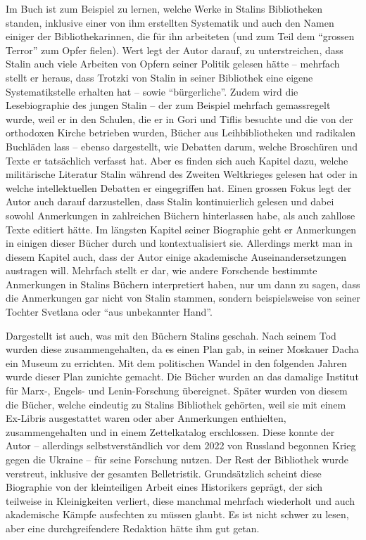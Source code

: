 \documentclass[a4paper,
fontsize=11pt,
oneside,
numbers=noperiodatend,
parskip=half-,
bibliography=totoc,
final
]{scrartcl}
\begin{document}
Im Buch ist zum Beispiel zu lernen, welche Werke in Stalins Bibliotheken
standen, inklusive einer von ihm erstellten Systematik und auch den
Namen einiger der Bibliothekarinnen, die für ihn arbeiteten (und zum
Teil dem \enquote{grossen Terror} zum Opfer fielen). Wert legt der Autor
darauf, zu unterstreichen, dass Stalin auch viele Arbeiten von Opfern
seiner Politik gelesen hätte -- mehrfach stellt er heraus, dass Trotzki
von Stalin in seiner Bibliothek eine eigene Systematikstelle erhalten
hat -- sowie \enquote{bürgerliche}. Zudem wird die Lesebiographie des
jungen Stalin -- der zum Beispiel mehrfach gemassregelt wurde, weil er
in den Schulen, die er in Gori und Tiflis besuchte und die von der
orthodoxen Kirche betrieben wurden, Bücher aus Leihbibliotheken und
radikalen Buchläden lass -- ebenso dargestellt, wie Debatten darum,
welche Broschüren und Texte er tatsächlich verfasst hat. Aber es finden
sich auch Kapitel dazu, welche militärische Literatur Stalin während des
Zweiten Weltkrieges gelesen hat oder in welche intellektuellen Debatten
er eingegriffen hat. Einen grossen Fokus legt der Autor auch darauf
darzustellen, dass Stalin kontinuierlich gelesen und dabei sowohl
Anmerkungen in zahlreichen Büchern hinterlassen habe, als auch zahllose
Texte editiert hätte. Im längsten Kapitel seiner Biographie geht er
Anmerkungen in einigen dieser Bücher durch und kontextualisiert sie.
Allerdings merkt man in diesem Kapitel auch, dass der Autor einige
akademische Auseinandersetzungen austragen will. Mehrfach stellt er dar,
wie andere Forschende bestimmte Anmerkungen in Stalins Büchern
interpretiert haben, nur um dann zu sagen, dass die Anmerkungen gar
nicht von Stalin stammen, sondern beispielsweise von seiner Tochter
Svetlana oder \enquote{aus unbekannter Hand}.

Dargestellt ist auch, was mit den Büchern Stalins geschah. Nach seinem
Tod wurden diese zusammengehalten, da es einen Plan gab, in seiner
Moskauer Dacha ein Museum zu errichten. Mit dem politischen Wandel in
den folgenden Jahren wurde dieser Plan zunichte gemacht. Die Bücher
wurden an das damalige Institut für Marx-, Engels- und Lenin-Forschung
übereignet. Später wurden von diesem die Bücher, welche eindeutig zu
Stalins Bibliothek gehörten, weil sie mit einem Ex-Libris ausgestattet
waren oder aber Anmerkungen enthielten, zusammengehalten und in einem
Zettelkatalog erschlossen. Diese konnte der Autor -- allerdings
selbstverständlich vor dem 2022 von Russland begonnen Krieg gegen die
Ukraine -- für seine Forschung nutzen. Der Rest der Bibliothek wurde
verstreut, inklusive der gesamten Belletristik. Grundsätzlich scheint
diese Biographie von der kleinteiligen Arbeit eines Historikers geprägt,
der sich teilweise in Kleinigkeiten verliert, diese manchmal mehrfach
wiederholt und auch akademische Kämpfe ausfechten zu müssen glaubt. Es
ist nicht schwer zu lesen, aber eine durchgreifendere Redaktion hätte
ihm gut getan.
\end{document}
